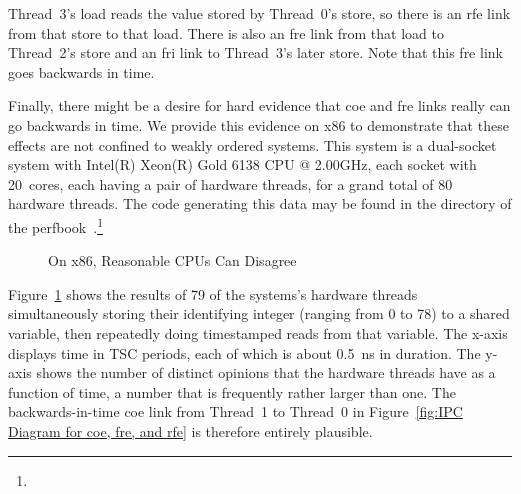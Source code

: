 \documentclass[10]{article}
\begin{document}
Thread~3's load reads the value stored by Thread~0's store, so there is
an rfe link from that store to that load.  There is also an fre link from
that load to Thread~2's store and an fri link to Thread~3's later store.
Note that this fre link goes backwards in time.

Finally, there might be a desire for hard evidence that coe and fre
links really can go backwards in time.
We provide this evidence on x86 to demonstrate that these effects
are not confined to weakly ordered systems.
This system is a dual-socket system with
Intel(R) Xeon(R) Gold 6138 CPU @ 2.00GHz,
each socket with 20~cores, each having a pair of hardware
threads, for a grand total of 80 hardware threads.
The code generating this data may be found in the 
directory of the
perfbook~\cite{McKenney2018ParallelProgramming-2018-12-08a}.\footnote{
	}

\begin{figure}[tb]
\begin{center}
\caption{On x86, Reasonable CPUs Can Disagree}
\label{fig:On x86; Reasonable CPUs Can Disagree}
\end{center}
\end{figure}

Figure~\ref{fig:On x86; Reasonable CPUs Can Disagree}
shows the results of 79 of the systems's hardware threads simultaneously
storing their identifying integer (ranging from 0 to 78) to a shared
variable, then repeatedly doing timestamped reads from that variable.
The x-axis displays time in TSC periods, each of which is about 0.5~ns
in duration.
The y-axis shows the number of distinct opinions that the hardware
threads have as a function of time, a number that is frequently rather
larger than one.
The backwards-in-time coe link from Thread~1 to Thread~0 in
Figure~\ref{fig:IPC Diagram for coe, fre, and rfe}
is therefore entirely plausible.
\end{document}
